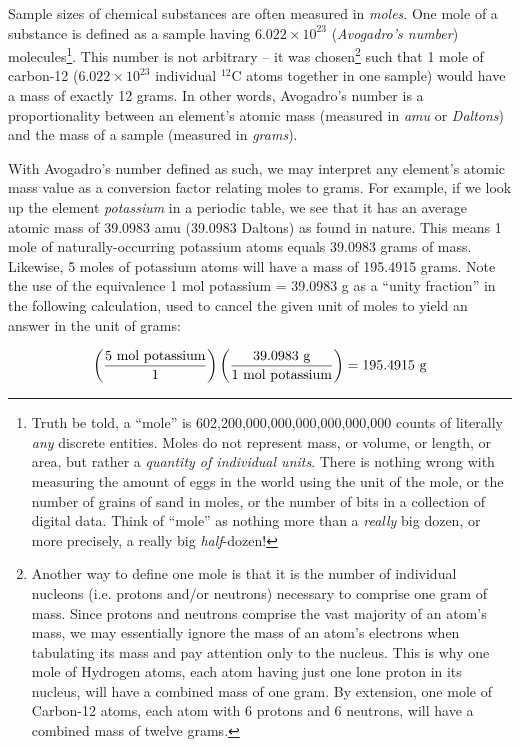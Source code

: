 Sample sizes of chemical substances are often measured in \textit{moles}.  One mole of a substance is defined as a sample having $6.022 \times 10^{23}$ (\textit{Avogadro's number}) molecules\footnote{Truth be told, a ``mole'' is 602,200,000,000,000,000,000,000 counts of literally \textit{any} discrete entities.  Moles do not represent mass, or volume, or length, or area, but rather a \textit{quantity of individual units}.  There is nothing wrong with measuring the amount of eggs in the world using the unit of the mole, or the number of grains of sand in moles, or the number of bits in a collection of digital data.  Think of ``mole'' as nothing more than a \textit{really} big dozen, or more precisely, a really big \textit{half}-dozen!}.  This number is not arbitrary -- it was chosen\footnote{Another way to define one mole is that it is the number of individual nucleons (i.e. protons and/or neutrons) necessary to comprise one gram of mass.  Since protons and neutrons comprise the vast majority of an atom's mass, we may essentially ignore the mass of an atom's electrons when tabulating its mass and pay attention only to the nucleus.  This is why one mole of Hydrogen atoms, each atom having just one lone proton in its nucleus, will have a combined mass of one gram.  By extension, one mole of Carbon-12 atoms, each atom with 6 protons and 6 neutrons, will have a combined mass of twelve grams.} such that 1 mole of carbon-12 ($6.022 \times 10^{23}$ individual $^{12}$C atoms together in one sample) would have a mass of exactly 12 grams.  In other words, Avogadro's number is a proportionality between an element's atomic mass (measured in \textit{amu} or \textit{Daltons}) and the mass of a sample (measured in \textit{grams}).           

With Avogadro's number defined as such, we may interpret any element's atomic mass value as a conversion factor relating moles to grams.  For example, if we look up the element \textit{potassium} in a periodic table, we see that it has an average atomic mass of 39.0983 amu (39.0983 Daltons) as found in nature.  This means 1 mole of naturally-occurring potassium atoms equals 39.0983 grams of mass.  Likewise, 5 moles of potassium atoms will have a mass of 195.4915 grams.  Note the use of the equivalence 1 mol potassium = 39.0983 g as a ``unity fraction'' in the following calculation, used to cancel the given unit of moles to yield an answer in the unit of grams:

$$\left({5 \hbox{ mol potassium} \over 1}\right) \left({39.0983 \hbox{ g} \over 1 \hbox{ mol potassium}}\right) = 195.4915 \hbox{ g}$$

